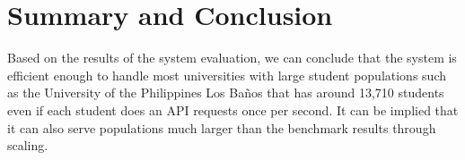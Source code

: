 \documentclass{sigchi}
\begin{document}
\section{Summary and Conclusion}

Based on the results of the system evaluation, we can conclude that the system is efficient enough to handle most 
universities with large student 
populations such as the University of the Philippines Los Baños that has around 13,710 students even if each student
does an API requests once per second. It can be implied that it can also serve populations much larger than the benchmark
results through scaling. 



\end{document}
